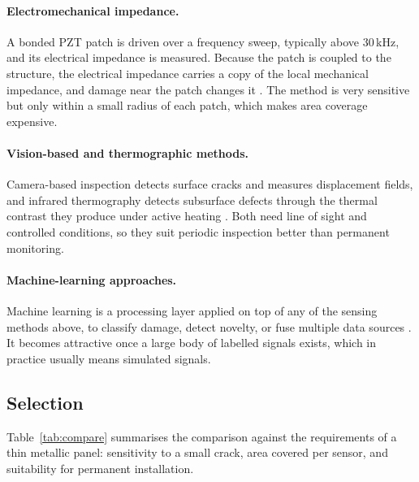 \paragraph{Electromechanical impedance.}
A bonded PZT patch is driven over a frequency sweep, typically above 30\,kHz, and its electrical impedance
is measured. Because the patch is coupled to the structure, the electrical impedance carries a copy of the
local mechanical impedance, and damage near the patch changes it \cite{Na2018}. The method is very
sensitive but only within a small radius of each patch, which makes area coverage expensive.

\paragraph{Vision-based and thermographic methods.}
Camera-based inspection detects surface cracks and measures displacement fields, and infrared thermography
detects subsurface defects through the thermal contrast they produce under active heating
\cite{He2020,Mardanshahi2025}. Both need line of sight and controlled conditions, so they suit periodic
inspection better than permanent monitoring.

\paragraph{Machine-learning approaches.}
Machine learning is a processing layer applied on top of any of the sensing methods above, to classify
damage, detect novelty, or fuse multiple data sources \cite{Jia2023,Hassani2023}. It becomes attractive once
a large body of labelled signals exists, which in practice usually means simulated signals.

\subsection{Selection}

Table~\ref{tab:compare} summarises the comparison against the requirements of a thin metallic panel:
sensitivity to a small crack, area covered per sensor, and suitability for permanent installation.

